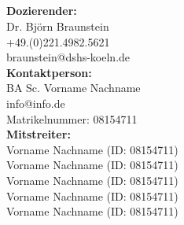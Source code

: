 \thispagestyle{empty}
\vspace*{3cm}
\begin{center}
\hrulefill \\
{\Large  \textbf{\assignment \\ \topic \\ \group} \par}
\hrulefill \\ \lastcompile
\end{center}
\vfill
\textbf{Dozierender:}\\
Dr. Bj\"orn Braunstein\\
\faPhone \hspace{5pt} +49.(0)221.4982.5621\\
\faEnvelopeO \hspace{5pt} braunstein@dshs-koeln.de\\[14pt]
\noindent
\textbf{Kontaktperson:}\\
BA Sc. Vorname Nachname\\
\faEnvelopeO \hspace{5pt} info@info.de\\
Matrikelnummer: 08154711\\[14pt]
\noindent
\textbf{Mitstreiter:}\\
Vorname Nachname (ID: 08154711)\\
Vorname Nachname (ID: 08154711)\\
Vorname Nachname (ID: 08154711)\\
Vorname Nachname (ID: 08154711)\\
Vorname Nachname (ID: 08154711)

